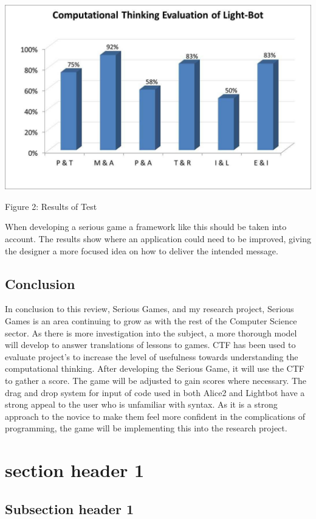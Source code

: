 \includegraphics[scale=0.35]{resultsOfTest.png}

Figure 2: Results of Test

When developing a serious game a framework like this should be taken into account. The results show where an application could need to be improved, giving the designer a more focused idea on how to deliver the intended message.

\subsection{Conclusion}
In conclusion to this review, Serious Games, and my research project, Serious Games is an area continuing to grow as with the rest of the Computer Science sector. As there is more investigation into the subject, a more thorough model will develop to answer translations of lessons to games.
CTF has been used to evaluate project's to increase the level of usefulness towards understanding the computational thinking. After developing the Serious Game, it will use the CTF to gather a score. The game will be adjusted to gain scores where necessary.
The drag and drop system for input of code used in both Alice2 and Lightbot have a strong appeal to the user who is unfamiliar with syntax. As it is a strong approach to the novice to make them feel more confident in the complications of programming,  the game will be implementing this into the research project.

\section{section header 1}




\subsection{Subsection header 1}




